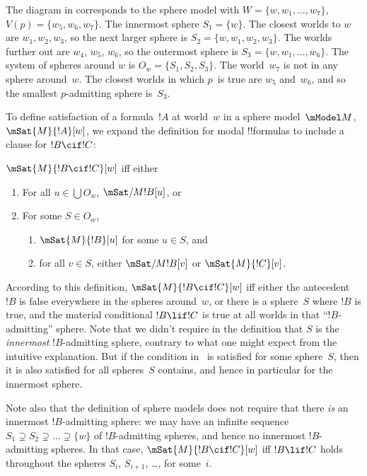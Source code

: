 \documentclass[../../../include/open-logic-section]{subfiles}
\begin{document}
The diagram in  corresponds to the sphere
model with $W = \{w, w_1, \dots, w_7\}$, $V(p) = \{w_5, w_6,
w_7\}$. The innermost sphere $S_1 = \{w\}$. The closest worlds to $w$
are $w_1, w_2, w_3$, so the next larger sphere is $S_2 = \{w, w_1,
w_2, w_3\}$. The worlds further out are $w_4$, $w_5$, $w_6$, so the
outermost sphere is $S_3 = \{w, w_1, \dots, w_6\}$. The system of
spheres around $w$ is $O_w = \{S_1, S_2, S_3\}$. The world~$w_7$ is
not in any sphere around~$w$. The closest worlds in which $p$~is true
are $w_5$ and~$w_6$, and so the smallest $p$-admitting sphere
is~$S_3$.

To define satisfaction of a formula~$!A$ at world~$w$ in a sphere
model~$\mModel M$, $\mSat{M}{!A}[w]$, we expand the definition for
modal !!{formula}s to include a clause for $!B \cif !C$:

\begin{defn}
  $\mSat{M}{!B \cif !C}[w]$ iff either
  \begin{enumerate}
  \item{} For all $u \in \bigcup O_w$, $\mSat/{M}{!B}[u]$, or
  \item{} For some $S \in O_w$,
    \begin{enumerate}
      \item $\mSat{M}{!B}[u]$ for some $u \in
        S$, and
      \item for all $v \in S$, either
        $\mSat/{M}{!B}[v]$ or $\mSat{M}{!C}[v]$.
    \end{enumerate}
  \end{enumerate}
\end{defn}

According to this definition, $\mSat{M}{!B \cif !C}[w]$ iff either the
antecedent~$!B$ is false everywhere in the spheres around~$w$, or
there is a sphere~$S$ where $!B$ is true, and the material conditional
$!B \lif !C$ is true at all worlds in that ``$!B$-admitting''
sphere. Note that we didn't require in the definition that $S$ is the
\emph{innermost} $!B$-admitting sphere, contrary to what one might
expect from the intuitive explanation. But if the condition
in~ is satisfied for some sphere~$S$, then it is
also satisfied for all spheres~$S$ contains, and hence in particular
for the innermost sphere.

Note also that the definition of sphere models does not require that
there \emph{is} an innermost $!B$-admitting sphere: we may have an
infinite sequence $S_1 \supsetneq S_2 \supsetneq \dots \supsetneq
\{w\}$ of $!B$-admitting spheres, and hence no innermost
$!B$-admitting spheres. In that case, $\mSat{M}{!B \cif !C}[w]$ iff
$!B \lif !C$ holds throughout the spheres $S_i$, $S_{i+1}$, \dots, for
some~$i$.
\end{document}
